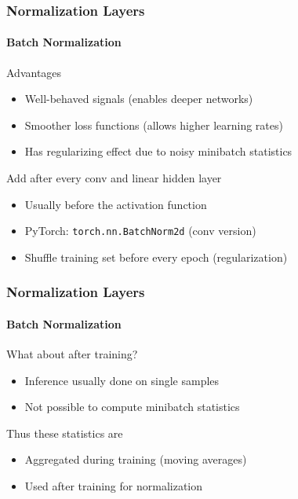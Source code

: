 \documentclass[xetex,professionalfont]{beamer}
\begin{document}
  
  \begin{frame}
    \frametitle{Normalization Layers}
  \framesubtitle{Batch Normalization}
  
  Advantages
  \begin{itemize}
      \item Well-behaved signals (enables deeper networks)
      \item Smoother loss functions (allows higher learning rates)
      \item Has regularizing effect due to noisy minibatch statistics
  \end{itemize}
  
  \bigskip
  
  Add after every conv and linear hidden layer
  \begin{itemize}
      \item Usually before the activation function
      \item PyTorch: \texttt{torch.nn.BatchNorm2d} (conv version)
      \item Shuffle training set before every epoch (regularization)
  \end{itemize}
  
  \end{frame}
  
  
  \begin{frame}
    \frametitle{Normalization Layers}
  \framesubtitle{Batch Normalization}
  
  What about after training?
  \begin{itemize}
      \item Inference usually done on single samples
      \item Not possible to compute minibatch statistics
  \end{itemize}
  
  \bigskip
  
  Thus these statistics are
  \begin{itemize}
      \item Aggregated during training (moving averages)
      \item Used after training for normalization
  \end{itemize}
  
  \end{frame}
\end{document}
